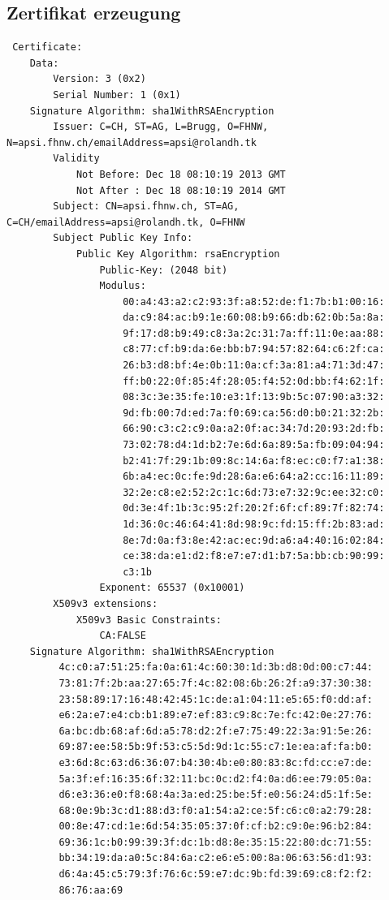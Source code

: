 \documentclass[10pt]{scrartcl}
\begin{document}
\subsection{Zertifikat erzeugung}
\begin{verbatim}
 Certificate:
    Data:
        Version: 3 (0x2)
        Serial Number: 1 (0x1)
    Signature Algorithm: sha1WithRSAEncryption
        Issuer: C=CH, ST=AG, L=Brugg, O=FHNW, N=apsi.fhnw.ch/emailAddress=apsi@rolandh.tk
        Validity
            Not Before: Dec 18 08:10:19 2013 GMT
            Not After : Dec 18 08:10:19 2014 GMT
        Subject: CN=apsi.fhnw.ch, ST=AG, C=CH/emailAddress=apsi@rolandh.tk, O=FHNW
        Subject Public Key Info:
            Public Key Algorithm: rsaEncryption
                Public-Key: (2048 bit)
                Modulus:
                    00:a4:43:a2:c2:93:3f:a8:52:de:f1:7b:b1:00:16:
                    da:c9:84:ac:b9:1e:60:08:b9:66:db:62:0b:5a:8a:
                    9f:17:d8:b9:49:c8:3a:2c:31:7a:ff:11:0e:aa:88:
                    c8:77:cf:b9:da:6e:bb:b7:94:57:82:64:c6:2f:ca:
                    26:b3:d8:bf:4e:0b:11:0a:cf:3a:81:a4:71:3d:47:
                    ff:b0:22:0f:85:4f:28:05:f4:52:0d:bb:f4:62:1f:
                    08:3c:3e:35:fe:10:e3:1f:13:9b:5c:07:90:a3:32:
                    9d:fb:00:7d:ed:7a:f0:69:ca:56:d0:b0:21:32:2b:
                    66:90:c3:c2:c9:0a:a2:0f:ac:34:7d:20:93:2d:fb:
                    73:02:78:d4:1d:b2:7e:6d:6a:89:5a:fb:09:04:94:
                    b2:41:7f:29:1b:09:8c:14:6a:f8:ec:c0:f7:a1:38:
                    6b:a4:ec:0c:fe:9d:28:6a:e6:64:a2:cc:16:11:89:
                    32:2e:c8:e2:52:2c:1c:6d:73:e7:32:9c:ee:32:c0:
                    0d:3e:4f:1b:3c:95:2f:20:2f:6f:cf:89:7f:82:74:
                    1d:36:0c:46:64:41:8d:98:9c:fd:15:ff:2b:83:ad:
                    8e:7d:0a:f3:8e:42:ac:ec:9d:a6:a4:40:16:02:84:
                    ce:38:da:e1:d2:f8:e7:e7:d1:b7:5a:bb:cb:90:99:
                    c3:1b
                Exponent: 65537 (0x10001)
        X509v3 extensions:
            X509v3 Basic Constraints: 
                CA:FALSE
    Signature Algorithm: sha1WithRSAEncryption
         4c:c0:a7:51:25:fa:0a:61:4c:60:30:1d:3b:d8:0d:00:c7:44:
         73:81:7f:2b:aa:27:65:7f:4c:82:08:6b:26:2f:a9:37:30:38:
         23:58:89:17:16:48:42:45:1c:de:a1:04:11:e5:65:f0:dd:af:
         e6:2a:e7:e4:cb:b1:89:e7:ef:83:c9:8c:7e:fc:42:0e:27:76:
         6a:bc:db:68:af:6d:a5:78:d2:2f:e7:75:49:22:3a:91:5e:26:
         69:87:ee:58:5b:9f:53:c5:5d:9d:1c:55:c7:1e:ea:af:fa:b0:
         e3:6d:8c:63:d6:36:07:b4:30:4b:e0:80:83:8c:fd:cc:e7:de:
         5a:3f:ef:16:35:6f:32:11:bc:0c:d2:f4:0a:d6:ee:79:05:0a:
         d6:e3:36:e0:f8:68:4a:3a:ed:25:be:5f:e0:56:24:d5:1f:5e:
         68:0e:9b:3c:d1:88:d3:f0:a1:54:a2:ce:5f:c6:c0:a2:79:28:
         00:8e:47:cd:1e:6d:54:35:05:37:0f:cf:b2:c9:0e:96:b2:84:
         69:36:1c:b0:99:39:3f:dc:1b:d8:8e:35:15:22:80:dc:71:55:
         bb:34:19:da:a0:5c:84:6a:c2:e6:e5:00:8a:06:63:56:d1:93:
         d6:4a:45:c5:79:3f:76:6c:59:e7:dc:9b:fd:39:69:c8:f2:f2:
         86:76:aa:69
\end{verbatim}
\end{document}
